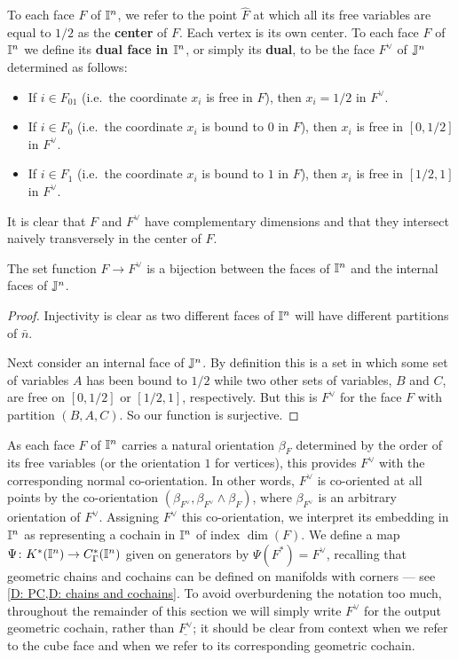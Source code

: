 To each face $F$ of $\mathbb{I}^n$, we refer to the point $\hat F$ at which all its free variables are equal to $1/2$ as the \textbf{center} of $F$.
Each vertex is its own center.
To each face $F$ of $\mathbb{I}^n$ we define its \textbf{dual face in $\mathbb{I}^n$}, or simply its \textbf{dual}, to be the face $F^\vee$ of $\mathbb{J}^n$ determined as follows:
\begin{itemize}
	\item If $i \in F_{01}$ (i.e.\ the coordinate $x_i$ is free in $F$), then $x_i = 1/2$ in $F^\vee$.

	\item If $i \in F_0$ (i.e.\ the coordinate $x_i$ is bound to $0$ in $F$), then $x_i$ is free in $[0,1/2]$ in $F^\vee$.

	\item If $i \in F_1$ (i.e.\ the coordinate $x_i$ is bound to $1$ in $F$), then $x_i$ is free in $[1/2,1]$ in $F^\vee$.
\end{itemize}

It is clear that $F$ and $F^\vee$ have complementary dimensions and that they intersect naively transversely in the center of $F$.

\begin{lemma}
	The set function $F \to F^\vee$ is a bijection between the faces of $\mathbb{I}^n$ and the internal faces of $\mathbb{J}^n$.
\end{lemma}

\begin{proof}
	Injectivity is clear as two different faces of $\mathbb{I}^n$ will have different partitions of $\bar n$.

	Next consider an internal face of $\mathbb{J}^n$.
	By definition this is a set in which some set of variables $A$ has been bound to $1/2$ while two other sets of variables, $B$ and $C$, are free on $[0,1/2]$ or $[1/2,1]$, respectively.
	But this is $F^\vee$ for the face $F$ with partition $(B,A,C)$.
	So our function is surjective.
\end{proof}

As each face $F$ of $\mathbb{I}^n$ carries a natural orientation $\beta_F$ determined by the order of its free variables (or the orientation $1$ for vertices), this provides $F^\vee$ with the corresponding normal co-orientation.
In other words, $F^\vee$ is co-oriented at all points by the co-orientation $(\beta_{F^\vee}, \beta_{F^\vee} \wedge \beta_F)$, where $\beta_{F^\vee}$ is an arbitrary orientation of $F^\vee$.
Assigning $F^\vee$ this co-orientation, we interpret its embedding in $\mathbb{I}^n$ as representing a cochain in $\mathbb{I}^n$ of index $\dim(F)$.
We define a map $\Psi \colon K^*(\mathbb{I}^n) \to C_\Gamma^*(\mathbb{I}^n)$ given on generators by $\Psi(F^*) = F^\vee$, recalling that geometric chains and cochains can be defined on manifolds with corners --- see \cref{D: PC,D: chains and cochains}.
To avoid overburdening the notation too much, throughout the remainder of this section we will simply write $F^\vee$ for the output geometric cochain, rather than $\underline{F^\vee}$; it should be clear from context when we refer to the cube face and when we refer to its corresponding geometric cochain.

